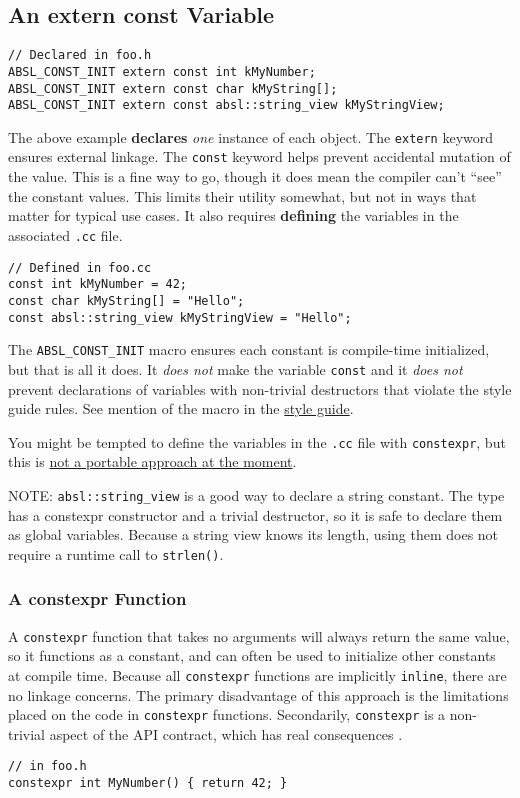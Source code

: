 \subsection{An extern const Variable}\label{subsec:an-extern-const-variable}
\begin{verbatim}
// Declared in foo.h
ABSL_CONST_INIT extern const int kMyNumber;
ABSL_CONST_INIT extern const char kMyString[];
ABSL_CONST_INIT extern const absl::string_view kMyStringView;
\end{verbatim}
The above example \textbf{declares} \emph{one} instance of each object. The \texttt{extern} keyword ensures external linkage. The \texttt{const} keyword helps prevent accidental mutation of the value. This is a fine way to go, though it does mean the compiler can’t \enquote{see} the constant values. This limits their utility somewhat, but not in ways that matter for typical use cases. It also requires \textbf{defining} the variables in the associated \texttt{.cc} file.
\begin{verbatim}
// Defined in foo.cc
const int kMyNumber = 42;
const char kMyString[] = "Hello";
const absl::string_view kMyStringView = "Hello";
\end{verbatim}
The \texttt{ABSL_CONST_INIT} macro ensures each constant is compile-time initialized, but that is all it does. It \emph{does not} make the variable \texttt{const} and it \emph{does not} prevent declarations of variables with non-trivial destructors that violate the style guide rules. See mention of the macro in the \hyperref[sec:static-and-global-variables]{style guide}.

You might be tempted to define the variables in the \texttt{.cc} file with \texttt{constexpr}, but this is \hyperref[subsubsec:non-portable-mistake]{not a portable approach at the moment}.

NOTE: \texttt{absl::string_view} is a good way to declare a string constant. The type has a constexpr constructor and a trivial destructor, so it is safe to declare them as global variables. Because a string view knows its length, using them does not require a runtime call to \texttt{strlen()}.

\subsubsection{A constexpr Function}
A \texttt{constexpr} function that takes no arguments will always return the same value, so it functions as a constant, and can often be used to initialize other constants at compile time. Because all \texttt{constexpr} functions are implicitly \texttt{inline}, there are no linkage concerns. The primary disadvantage of this approach is the limitations placed on the code in \texttt{constexpr} functions. Secondarily, \texttt{constexpr} is a non-trivial aspect of the API contract, which has real consequences .
\begin{verbatim}
// in foo.h
constexpr int MyNumber() { return 42; }
\end{verbatim}

